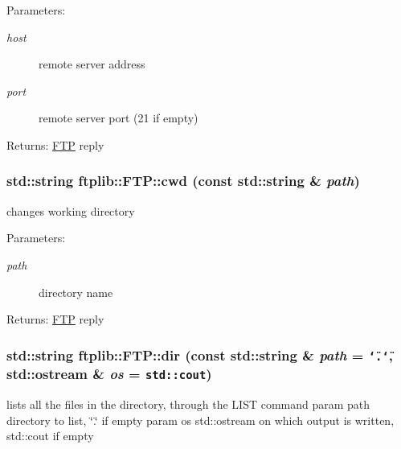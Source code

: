 \begin{Desc}
\item[Parameters:]
\begin{description}
\item[{\em host}]remote server address \item[{\em port}]remote server port (21 if empty) \end{description}
\end{Desc}
\begin{Desc}
\item[Returns:]\hyperlink{classftplib_1_1FTP}{FTP} reply \end{Desc}
\hypertarget{classftplib_1_1FTP_7cd3c7fc71ae0c7dbdfcee88417d2685}{
\subsubsection[{cwd}]{\setlength{\rightskip}{0pt plus 5cm}std::string ftplib::FTP::cwd (const std::string \& {\em path})}}
\label{classftplib_1_1FTP_7cd3c7fc71ae0c7dbdfcee88417d2685}


changes working directory 

\begin{Desc}
\item[Parameters:]
\begin{description}
\item[{\em path}]directory name \end{description}
\end{Desc}
\begin{Desc}
\item[Returns:]\hyperlink{classftplib_1_1FTP}{FTP} reply \end{Desc}
\hypertarget{classftplib_1_1FTP_42749c4425e33349f605ec0a8b389731}{
\subsubsection[{dir}]{\setlength{\rightskip}{0pt plus 5cm}std::string ftplib::FTP::dir (const std::string \& {\em path} = {\tt \char`\"{}.\char`\"{}}, \/  std::ostream \& {\em os} = {\tt std::cout})}}
\label{classftplib_1_1FTP_42749c4425e33349f605ec0a8b389731}


lists all the files in the directory, through the LIST command param path directory to list, \char`\"{}.\char`\"{} if empty param os std::ostream on which output is written, std::cout if empty 

